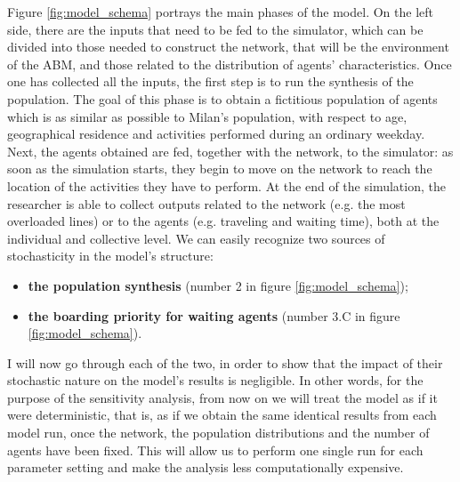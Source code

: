 Figure \ref{fig:model_schema} portrays the main phases of the model. On the left side, there are the inputs that need to be fed to the simulator, which can be divided into those needed to construct the network, that will be the environment of the ABM, and those related to the distribution of agents' characteristics. Once one has collected all the inputs, the first step is to run the synthesis of the population. The goal of this phase is to obtain a fictitious population of agents which is as similar as possible to Milan's population, with respect to age, geographical residence and activities performed during an ordinary weekday. Next, the agents obtained are fed, together with the network, to the simulator: as soon as the simulation starts, they begin to move on the network to reach the location of the activities they have to perform. At the end of the simulation, the researcher is able to collect outputs related to the network (e.g. the most overloaded lines) or to the agents (e.g. traveling and waiting time), both at the individual and collective level. 
We can easily recognize two sources of stochasticity in the model's structure:
\begin{itemize}
	\item \textbf{the population synthesis} (number 2 in figure \ref{fig:model_schema});
	\item \textbf{the boarding priority for waiting agents} (number 3.C in figure \ref{fig:model_schema}). 
\end{itemize}
I will now go through each of the two, in order to show that the impact of their stochastic nature on the model's results is negligible. In other words, for the purpose of the sensitivity analysis, from now on we will treat the model as if it were deterministic, that is, as if we obtain the same identical results from each model run, once the network, the population distributions and the number of agents have been fixed. This will allow us to perform one single run for each parameter setting and make the analysis less computationally expensive.

